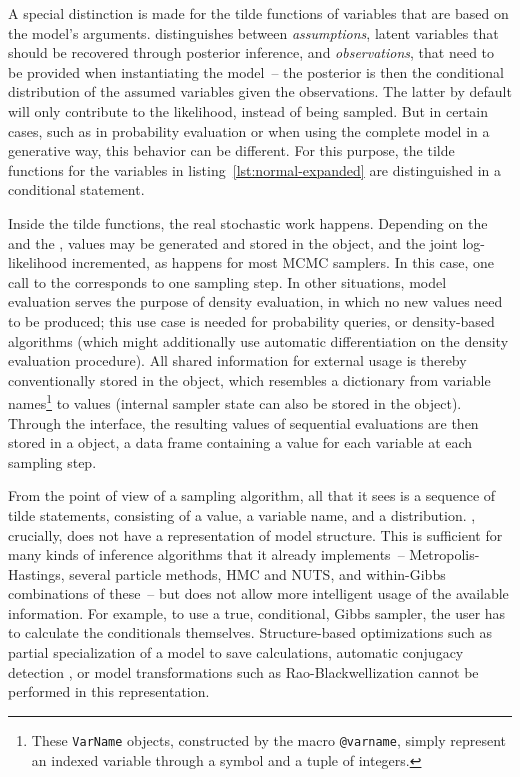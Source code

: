 A special distinction is made for the tilde functions of variables that are based on the model's
arguments.  \dppljl{} distinguishes between \emph{assumptions}, latent variables that should be
recovered through posterior inference, and \emph{observations}, that need to be provided when
instantiating the model~-- the posterior is then the conditional distribution of the assumed
variables given the observations.  The latter by default will only contribute to the likelihood,
instead of being sampled.  But in certain cases, such as in probability evaluation or when using the
complete model in a generative way, this behavior can be different.  For this purpose, the tilde
functions for the variables  in listing~\ref{lst:normal-expanded} are distinguished in a
conditional statement.

Inside the tilde functions, the real stochastic work happens.  Depending on the  and
the , values may be generated and stored in the  object, and the joint
log-likelihood incremented, as happens for most MCMC samplers.  In this case, one call to the
 corresponds to one sampling step.  In other situations, model evaluation serves
the purpose of density evaluation, in which no new values need to be produced; this use case is
needed for probability queries, or density-based algorithms (which might additionally use automatic
differentiation on the density evaluation procedure).  All shared information for external usage is
thereby conventionally stored in the  object, which resembles a dictionary from
variable names\footnote{These \texttt{VarName} objects, constructed by the macro \texttt{@varname},
  simply represent an indexed variable through a symbol and a tuple of integers.} to values
(internal sampler state can also be stored in the  object).  Through the
 interface, the resulting values of sequential evaluations are then stored in a
 object, a data frame containing a value for each variable at each sampling step.

From the point of view of a sampling algorithm, all that it sees is a sequence of tilde statements,
consisting of a value, a variable name, and a distribution.  \turingjl{}, crucially, does not have a
representation of model structure.  This is sufficient for many kinds of inference algorithms that
it already implements~-- Metropolis-Hastings, several particle methods, HMC and NUTS, and
within-Gibbs combinations of these~-- but does not allow more intelligent usage of the available
information.  For example, to use a true, conditional, Gibbs sampler, the user has to calculate the
conditionals themselves.  Structure-based optimizations such as partial specialization of a model to
save calculations, automatic conjugacy detection \parencite{hoffman2018autoconj}, or model
transformations such as Rao-Blackwellization \parencite{murray2017delayed} cannot be performed in
this representation.


